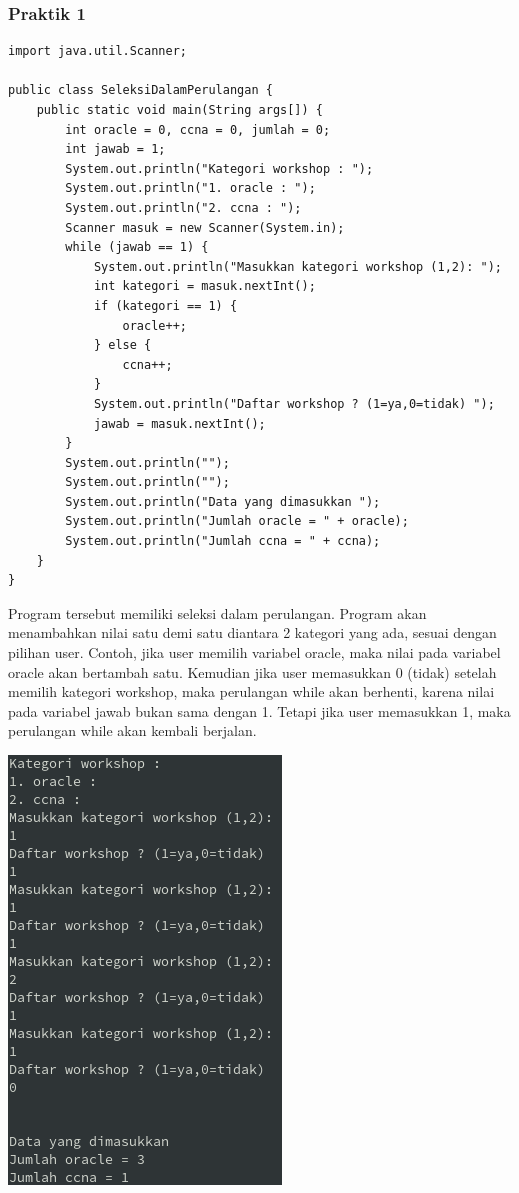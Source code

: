 \documentclass[a4paper,12pt]{article}
\begin{document}
\subsubsection{Praktik 1}
\begin{lstlisting}
import java.util.Scanner;

public class SeleksiDalamPerulangan {
    public static void main(String args[]) {
        int oracle = 0, ccna = 0, jumlah = 0;
        int jawab = 1;
        System.out.println("Kategori workshop : ");
        System.out.println("1. oracle : ");
        System.out.println("2. ccna : ");
        Scanner masuk = new Scanner(System.in);
        while (jawab == 1) {
            System.out.println("Masukkan kategori workshop (1,2): ");
            int kategori = masuk.nextInt();
            if (kategori == 1) {
                oracle++;
            } else {
                ccna++;
            }
            System.out.println("Daftar workshop ? (1=ya,0=tidak) ");
            jawab = masuk.nextInt();
        }
        System.out.println("");
        System.out.println("");
        System.out.println("Data yang dimasukkan ");
        System.out.println("Jumlah oracle = " + oracle);
        System.out.println("Jumlah ccna = " + ccna);
    }
}
\end{lstlisting}
Program tersebut memiliki seleksi dalam perulangan. Program akan menambahkan nilai satu demi satu diantara 2 kategori
yang ada, sesuai dengan pilihan user. Contoh, jika user memilih variabel oracle, maka nilai pada variabel oracle akan
bertambah satu. Kemudian jika user memasukkan 0 (tidak) setelah memilih kategori workshop, maka perulangan while akan
berhenti, karena nilai pada variabel jawab bukan sama dengan 1. Tetapi jika user memasukkan 1, maka perulangan while
akan kembali berjalan.
\begin{center}
    \includegraphics{1.png} 
\end{center}
\end{document}

